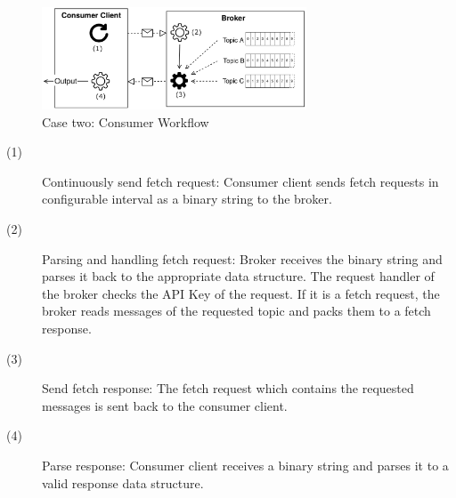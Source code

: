 \begin{figure}[H]
    \centering
   \includegraphics[width=0.7\textwidth]{images/concept_consumer.png}
    \caption{Case two: Consumer Workflow}
    \label{fig:concept-consumer}
\end{figure}

\begin{description}
    \item [(1)] 
        {Continuously send fetch request: Consumer client sends fetch
        requests in configurable interval as a binary string to the broker. } 
    \item [(2)] 
        {Parsing and handling fetch request: Broker receives the binary string
            and parses it back to the appropriate data structure. The request
            handler of the broker checks the API Key of the request. If it is a
            fetch request, the broker reads messages of the requested topic and
            packs them to a fetch response.}
    \item [(3)] 
        {Send fetch response: The fetch request which contains the requested
        messages is sent back to the consumer client.}
    \item [(4)] 
        {Parse response: Consumer client receives a binary string and parses it
        to a valid response data structure. }
\end{description}

